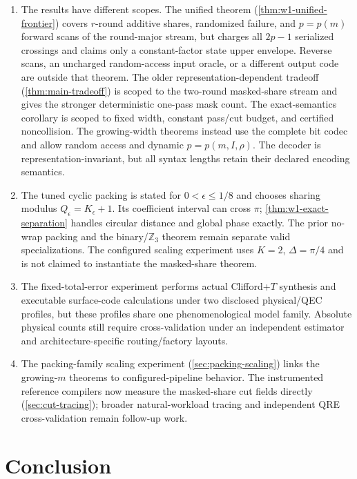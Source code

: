 \documentclass[aps,prx,reprint,floatfix,superscriptaddress]{revtex4-2}
\begin{document}
\begin{enumerate}[leftmargin=1.5em]
    \item The results have different scopes.  The unified theorem
    (\cref{thm:w1-unified-frontier}) covers $r$-round additive shares,
    randomized failure, and $p=p(m)$ forward scans of the round-major
    stream, but charges all $2p-1$ serialized crossings and claims only a
    constant-factor state upper envelope.  Reverse scans, an uncharged
    random-access input oracle, or a different output code are outside that
    theorem.  The older representation-dependent tradeoff
    (\cref{thm:main-tradeoff}) is scoped to the two-round masked-share
    stream and gives the stronger deterministic one-pass mask count.  The
    exact-semantics corollary is scoped to fixed width, constant pass/cut
    budget, and certified noncollision.  The growing-width theorems instead
    use the complete bit codec and allow random access and dynamic
    $p=p(m,I,\rho)$.  The decoder is representation-invariant, but all
    syntax lengths retain their declared encoding semantics.
    \item The tuned cyclic packing is stated for
    $0<\epsilon\leq1/8$ and chooses sharing modulus
    $Q_\epsilon=K_\epsilon+1$.  Its coefficient interval can cross $\pi$;
    \cref{thm:w1-exact-separation} handles circular distance and global
    phase exactly.  The prior no-wrap packing and the binary/$\mathbb Z_3$
    theorem remain separate valid specializations.
    The configured scaling experiment uses $K=2$, $\Delta=\pi/4$ and is not
    claimed to instantiate the masked-share theorem.
    \item The fixed-total-error experiment performs actual Clifford+$T$
    synthesis and executable surface-code calculations under two disclosed
    physical/QEC profiles, but these profiles share one phenomenological model
    family.  Absolute physical counts still require cross-validation under an
    independent estimator and architecture-specific routing/factory layouts.
    \item The packing-family scaling experiment
    (\cref{sec:packing-scaling}) links the growing-$m$ theorems to
    configured-pipeline behavior.  The instrumented reference compilers now
    measure the masked-share cut fields directly
    (\cref{sec:cut-tracing}); broader natural-workload tracing and independent
    QRE cross-validation remain follow-up work.
\end{enumerate}


\section{Conclusion}
\label{sec:conclusion}
\end{document}

